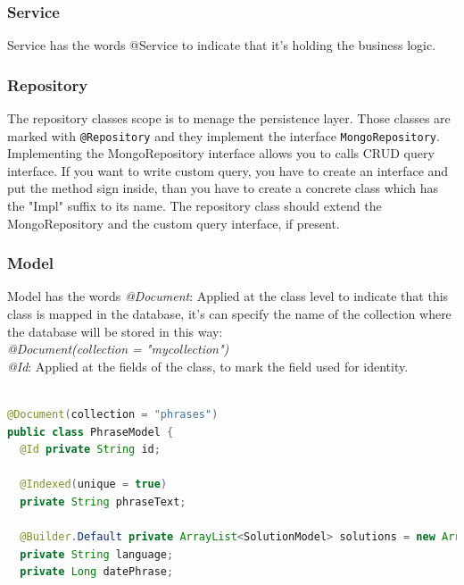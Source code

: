 \subsubsection{Service}
Service has the words @Service to indicate that it’s holding the business logic. 

\subsubsection{Repository}
The repository classes scope is to menage the persistence layer. Those classes are marked with \texttt{@Repository} and they implement the interface \texttt{MongoRepository}. Implementing the MongoRepository interface allows you to calls CRUD query interface. 
If you want to write custom query, you have to create an interface and put the method sign inside, than you have to create a concrete class which has the "Impl" suffix to its name. The repository class should extend the MongoRepository and the custom query interface, if present. 
\subsubsection{Model}
Model has the words \textit{@Document}: Applied at the class level to indicate that this class is mapped in the database, it's can specify the name of the collection where the database will be stored in this way:\\ \textit{@Document(collection = "mycollection")}\\
\textit{@Id}: Applied at the fields of the class, to mark the field used for identity.

\begin{lstlisting}[language=Java]

@Document(collection = "phrases")
public class PhraseModel {
  @Id private String id;

  @Indexed(unique = true)
  private String phraseText;

  @Builder.Default private ArrayList<SolutionModel> solutions = new ArrayList<>();
  private String language;
  private Long datePhrase;
 \end{lstlisting}